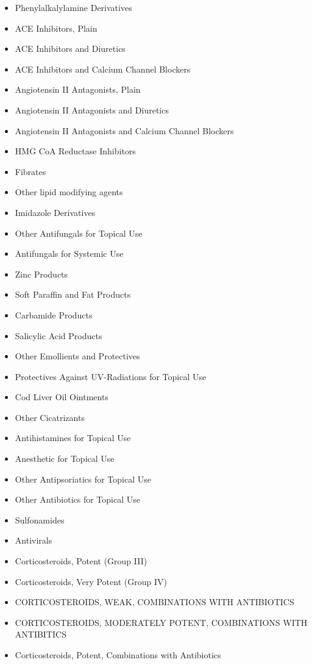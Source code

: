 \documentclass[a4paper,12pt]{article}
\begin{document}
\begin{appendices}
\begin{itemize}
   			\item Phenylalkalylamine Derivatives
   			\item ACE Inhibitors, Plain
   			\item ACE Inhibitors and Diuretics
   			\item ACE Inhibitors and Calcium Channel Blockers
   			\item Angiotensin II Antagonists, Plain
   			\item Angiotensin II Antagonists and Diuretics
   			\item Angiotensin II Antagonists and Calcium Channel Blockers
   			\item HMG CoA Reductase Inhibitors
   			\item Fibrates
   			\item Other lipid modifying agents
   			\item Imidazole Derivatives
   			\item Other Antifungals for Topical Use
   			\item Antifungals for Systemic Use
   			\item Zinc Products
   			\item Soft Paraffin and Fat Products
   			\item Carbamide Products
   			\item Salicylic Acid Products
   			\item Other Emollients and Protectives
   			\item Protectives Against UV-Radiations for Topical Use
   			\item Cod Liver Oil Ointments
   			\item Other Cicatrizants
   			\item Antihistamines for Topical Use
   			\item Anesthetic for Topical Use
   			\item Other Antipsoriatics for Topical Use
   			\item Other Antibiotics for Topical Use
   			\item Sulfonamides
   			\item Antivirals
   			\item Corticosteroids, Potent (Group III)
   			\item Corticosteroids, Very Potent (Group IV)
   			\item CORTICOSTEROIDS, WEAK, COMBINATIONS WITH ANTIBIOTICS
   			\item CORTICOSTEROIDS, MODERATELY POTENT, COMBINATIONS WITH ANTIBITICS
   			\item Corticosteroids, Potent, Combinations with Antibiotics

\end{itemize}
\end{appendices}
\end{document}
